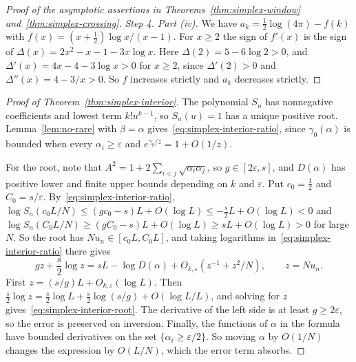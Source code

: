 \begin{proof}[Proof of the asymptotic assertions in
Theorems~\ref{thm:simplex-window} and~\ref{thm:simplex-crossing}]
\emph{Step 4. Part (iv).} We have $a_k=\frac12\log(4\pi)-f(k)$ with
$f(x)=(x+\frac12)\log x/(x-1)$. For $x\ge2$ the sign of $f'(x)$ is the sign of
$\Delta(x)=2x^2-x-1-3x\log x$. Here $\Delta(2)=5-6\log2>0$, and
$\Delta'(x)=4x-4-3\log x>0$ for $x\ge2$, since $\Delta'(2)>0$ and
$\Delta''(x)=4-3/x>0$. So $f$ increases strictly and $a_k$ decreases strictly.
\end{proof}

\begin{proof}[Proof of Theorem~\ref{thm:simplex-interior}]
The polynomial $S_n$ has nonnegative coefficients and lowest term $k!u^{k-1}$,
so $S_n(u)=1$ has a unique positive root. Lemma~\ref{lem:no-rare} with
$\beta=\alpha$ gives~\eqref{eq:simplex-interior-ratio}, since $\gamma_0(\alpha)$
is bounded when every $\alpha_i\ge\varepsilon$ and $e^{\gamma_0/z}=1+O(1/z)$.

For the root, note that $A^2=1+2\sum_{i<j}\sqrt{\alpha_i\alpha_j}$, so
$g\in[2\varepsilon,s]$, and $D(\alpha)$ has positive lower and finite upper
bounds depending on $k$ and $\varepsilon$. Put $c_0=\frac12$ and
$C_0=s/\varepsilon$. By~\eqref{eq:simplex-interior-ratio},
$\log S_n(c_0L/N)\le(gc_0-s)L+O(\log L)\le-\frac s2L+O(\log L)<0$ and
$\log S_n(C_0L/N)\ge(gC_0-s)L+O(\log L)\ge sL+O(\log L)>0$ for large $N$. So the
root has $Nu_n\in[c_0L,C_0L]$, and taking logarithms
in~\eqref{eq:simplex-interior-ratio} there gives
\[
gz+\frac s2\log z=sL-\log D(\alpha)+O_{k,\varepsilon}(z^{-1}+z^2/N),
\qquad z=Nu_n.
\]
First $z=(s/g)L+O_{k,\varepsilon}(\log L)$. Then
$\frac s2\log z=\frac s2\log L+\frac s2\log(s/g)+O(\log L/L)$, and solving for
$z$ gives~\eqref{eq:simplex-interior-root}. The derivative of the left side is
at least $g\ge2\varepsilon$, so the error is preserved on inversion. Finally,
the functions of $\alpha$ in the formula have bounded derivatives on the set
$\{\alpha_i\ge\varepsilon/2\}$. So moving $\alpha$ by $O(1/N)$ changes the
expression by $O(L/N)$, which the error term absorbs.
\end{proof}

